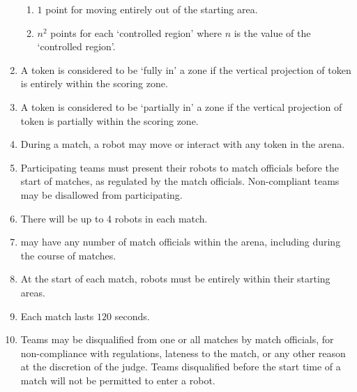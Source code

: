 \begin{enumerate}
\begin{enumerate}
      \item $1$ point for moving entirely out of the starting area.
      \item $n^2$ points for each `controlled region' where $n$ is the value of the `controlled region'.
    \end{enumerate}
  \item A token is considered to be `fully in' a zone if the vertical projection of token
        is entirely within the scoring zone.
  \item A token is considered to be `partially in' a zone if the vertical projection of token
        is partially within the scoring zone.
  \item During a match, a robot may move or interact with any token in the arena.
  \item Participating teams must present their robots to match officials before
        the start of matches, as regulated by the match officials. Non-compliant
        teams may be disallowed from participating.
  \item There will be up to 4 robots in each match.
  \item \org may have any number of match officials within the arena, including
        during the course of matches.
  \item At the start of each match, robots must be entirely within their
        starting areas.
  \item Each match lasts $120$ seconds.
  \item Teams may be disqualified from one or all matches by match officials,
        for non-compliance with regulations, lateness to the match, or any other
        reason at the discretion of the judge. Teams disqualified before the
        start time of a match will not be permitted to enter a robot.
\end{enumerate}
